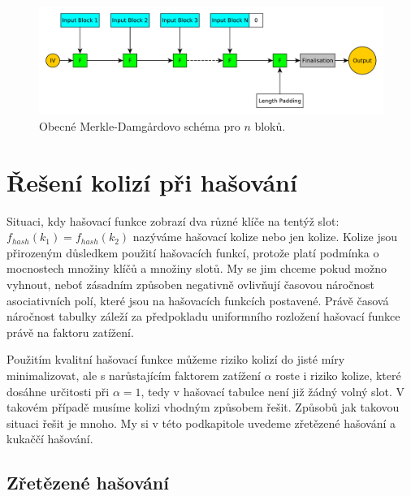 \begin{figure}
	\centering
	\includegraphics[width=\textwidth]{fig/merkle_damgard}
	\caption{Obecné Merkle-Damg\r{a}rdovo schéma pro $n$ bloků.}
	\label{fig:merkle_damgard}
\end{figure}

\section{Řešení kolizí při hašování}
\label{sec:collisions}

Situaci, kdy hašovací funkce zobrazí dva různé klíče na tentýž slot:
$f_{hash} (k_{1}) = f_{hash} (k_{2})$ nazýváme hašovací kolize nebo jen kolize. 
Kolize jsou přirozeným důsledkem použití hašovacích funkcí, protože platí podmínka o
mocnostech množiny klíčů a množiny slotů.
My se jim chceme pokud možno vyhnout, neboť zásadním způsoben negativně ovlivňují 
časovou náročnost asociativních polí, které jsou na hašovacích funkcích postavené. 
Právě časová náročnost tabulky záleží za předpokladu uniformního rozložení 
hašovací funkce právě na faktoru zatížení. 

Použitím kvalitní hašovací funkce můžeme riziko kolizí do jisté míry minimalizovat, ale
s narůstajícím faktorem zatížení $\alpha$ roste i riziko kolize, které dosáhne 
určitosti při $\alpha = 1$, tedy v hašovací tabulce není již žádný volný slot.
V takovém případě musíme kolizi vhodným způsobem řešit. Způsobů jak takovou situaci
řešit je mnoho. My si v této podkapitole uvedeme zřetězené hašování a kukaččí hašování.

\subsection{Zřetězené hašování}


